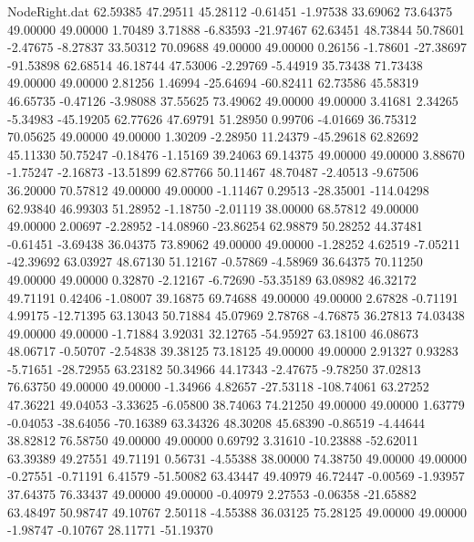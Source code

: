 \begin{filecontents}{NodeRight.dat}
  62.59385   47.29511   45.28112    -0.61451   -1.97538   33.69062   73.64375   49.00000   49.00000    1.70489    3.71888   -6.83593  -21.97467
  62.63451   48.73844   50.78601    -2.47675   -8.27837   33.50312   70.09688   49.00000   49.00000    0.26156   -1.78601  -27.38697  -91.53898
  62.68514   46.18744   47.53006    -2.29769   -5.44919   35.73438   71.73438   49.00000   49.00000    2.81256    1.46994  -25.64694  -60.82411
  62.73586   45.58319   46.65735    -0.47126   -3.98088   37.55625   73.49062   49.00000   49.00000    3.41681    2.34265   -5.34983  -45.19205
  62.77626   47.69791   51.28950     0.99706   -4.01669   36.75312   70.05625   49.00000   49.00000    1.30209   -2.28950   11.24379  -45.29618
  62.82692   45.11330   50.75247    -0.18476   -1.15169   39.24063   69.14375   49.00000   49.00000    3.88670   -1.75247   -2.16873  -13.51899
  62.87766   50.11467   48.70487    -2.40513   -9.67506   36.20000   70.57812   49.00000   49.00000   -1.11467    0.29513  -28.35001 -114.04298
  62.93840   46.99303   51.28952    -1.18750   -2.01119   38.00000   68.57812   49.00000   49.00000    2.00697   -2.28952  -14.08960  -23.86254
  62.98879   50.28252   44.37481    -0.61451   -3.69438   36.04375   73.89062   49.00000   49.00000   -1.28252    4.62519   -7.05211  -42.39692
  63.03927   48.67130   51.12167    -0.57869   -4.58969   36.64375   70.11250   49.00000   49.00000    0.32870   -2.12167   -6.72690  -53.35189
  63.08982   46.32172   49.71191     0.42406   -1.08007   39.16875   69.74688   49.00000   49.00000    2.67828   -0.71191    4.99175  -12.71395
  63.13043   50.71884   45.07969     2.78768   -4.76875   36.27813   74.03438   49.00000   49.00000   -1.71884    3.92031   32.12765  -54.95927
  63.18100   46.08673   48.06717    -0.50707   -2.54838   39.38125   73.18125   49.00000   49.00000    2.91327    0.93283   -5.71651  -28.72955
  63.23182   50.34966   44.17343    -2.47675   -9.78250   37.02813   76.63750   49.00000   49.00000   -1.34966    4.82657  -27.53118 -108.74061
  63.27252   47.36221   49.04053    -3.33625   -6.05800   38.74063   74.21250   49.00000   49.00000    1.63779   -0.04053  -38.64056  -70.16389
  63.34326   48.30208   45.68390    -0.86519   -4.44644   38.82812   76.58750   49.00000   49.00000    0.69792    3.31610  -10.23888  -52.62011
  63.39389   49.27551   49.71191     0.56731   -4.55388   38.00000   74.38750   49.00000   49.00000   -0.27551   -0.71191    6.41579  -51.50082
  63.43447   49.40979   46.72447    -0.00569   -1.93957   37.64375   76.33437   49.00000   49.00000   -0.40979    2.27553   -0.06358  -21.65882
  63.48497   50.98747   49.10767     2.50118   -4.55388   36.03125   75.28125   49.00000   49.00000   -1.98747   -0.10767   28.11771  -51.19370

\end{filecontents}
